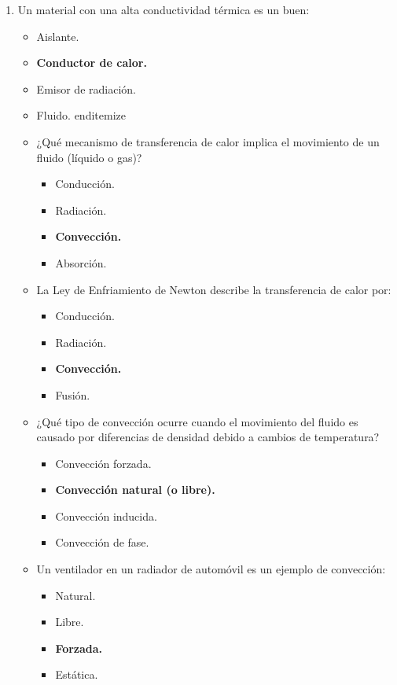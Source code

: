 \documentclass{article}
\begin{document}
\begin{enumerate}[label=\arabic*.]
    \item Un material con una alta conductividad térmica es un buen:
    \begin{itemize}[label=\alph*)]
        \item Aislante.
        \item \textbf{Conductor de calor.}
        \item Emisor de radiación.
        \item Fluido.
    end{itemize}

    \item ¿Qué mecanismo de transferencia de calor implica el movimiento de un fluido (líquido o gas)?
    \begin{itemize}[label=\alph*)]
        \item Conducción.
        \item Radiación.
        \item \textbf{Convección.}
        \item Absorción.
    \end{itemize}

    \item La Ley de Enfriamiento de Newton describe la transferencia de calor por:
    \begin{itemize}[label=\alph*)]
        \item Conducción.
        \item Radiación.
        \item \textbf{Convección.}
        \item Fusión.
    \end{itemize}

    \item ¿Qué tipo de convección ocurre cuando el movimiento del fluido es causado por diferencias de densidad debido a cambios de temperatura?
    \begin{itemize}[label=\alph*)]
        \item Convección forzada.
        \item \textbf{Convección natural (o libre).}
        \item Convección inducida.
        \item Convección de fase.
    \end{itemize}

    \item Un ventilador en un radiador de automóvil es un ejemplo de convección:
    \begin{itemize}[label=\alph*)]
        \item Natural.
        \item Libre.
        \item \textbf{Forzada.}
        \item Estática.
    \end{itemize}


\end{itemize}
\end{enumerate}
\end{document}
